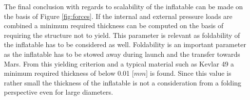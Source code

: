 The final conclusion with regards to scalability of the inflatable can be made on the basis of Figure \ref{fig:forces}. If the internal and external pressure loads are combined a minimum required thickness can be computed on the basis of requiring the structure not to yield. This parameter is relevant as foldability of the inflatable has to be considered as well. Foldability is an important parameter as the inflatable has to be stowed away during launch and the transfer towards Mars. From this yielding criterion and a typical material such as Kevlar 49 a minimum required thickness of below 0.01 [$mm$] is found. Since this value is rather small the thickness of the inflatable is not a consideration from a folding perspective even for large diameters.